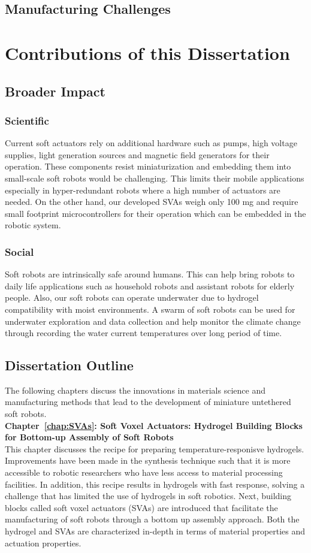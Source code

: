 \subsection{Manufacturing Challenges}

\section{Contributions of this Dissertation}

\subsection{Broader Impact}
\subsubsection{Scientific}
Current soft actuators rely on additional hardware such as pumps, high voltage supplies, light generation sources and magnetic field generators for their operation. These components resist miniaturization and embedding them into small-scale soft robots would be challenging. This limits their mobile applications especially in hyper-redundant robots where a high number of actuators are needed. On the other hand, our developed SVAs weigh only 100 mg and require small footprint microcontrollers for their operation which can be embedded in the robotic system. 
\subsubsection{Social}
Soft robots are intrinsically safe around humans. This can help bring robots to daily life applications such as household robots and assistant robots for elderly people. Also, our soft robots can operate underwater due to hydrogel compatibility with moist environments. A swarm of soft robots can be used for underwater exploration and data collection and help monitor the climate change through recording the water current temperatures over long period of time.

\subsection{Dissertation Outline}
The following chapters discuss the innovations in materials science and manufacturing methods that lead to the development of miniature untethered soft robots.\\ 
\textbf{Chapter~\ref{chap:SVAs}: Soft Voxel Actuators: Hydrogel Building Blocks for Bottom-up Assembly of Soft Robots}\\
This chapter discusses the recipe for preparing temperature-responisve hydrogels. Improvements have been made in the synthesis technique such that it is more accessible to robotic researchers who have less access to material processing facilities. In addition, this recipe results in hydrogels with fast response, solving a challenge that has limited the use of hydrogels in soft robotics. Next, building blocks called soft voxel actuators (SVAs) are introduced that facilitate the manufacturing of soft robots through a bottom up assembly approach. Both the hydrogel and SVAs are characterized in-depth in terms of material properties and actuation properties.
  
